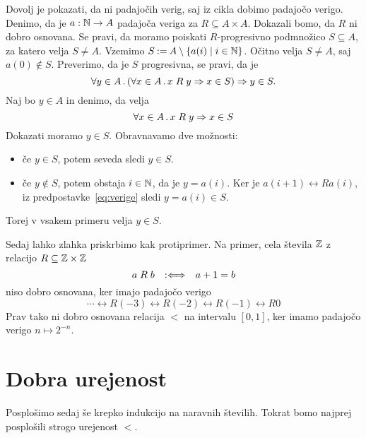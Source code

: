 \begin{dokaz}
  Dovolj je pokazati, da ni padajočih verig, saj iz cikla dobimo padajočo verigo.
  Denimo, da je $a : \mathbb{N} \to A$ padajoča veriga za $R \subseteq A \times A$. Dokazali bomo, da $R$ ni dobro
  osnovana. Se pravi, da moramo poiskati $R$-progresivno podmnožico $S \subseteq A$, za katero velja
  $S \neq A$. Vzemimo $S \mathbin{{:}{=}} A \setminus \left\{ a(i) \mid i \in \mathbb{N}\right\}$. Očitno velja $S \neq A$, saj 
  $a(0) \not\in S$. Preverimo, da je $S$ progresivna, se pravi, da je
  \begin{equation*}
    \forall y \in A \,.\, (\forall x \in A \,.\, x \mathrel{R} y \Rightarrow x \in S) \Rightarrow y \in S.
  \end{equation*}
  Naj bo $y \in A$ in denimo, da velja
  \begin{equation}
    \label{eq:verige}
    \forall x \in A \,.\, x \mathrel{R} y \Rightarrow x \in S
  \end{equation}
  Dokazati moramo $y \in S$. Obravnavamo dve možnosti:
  \begin{itemize}
  \item če $y \in S$, potem seveda sledi $y \in S$.
  \item če $y \not\in S$, potem obstaja $i \in \mathbb{N}$, da je $y = a(i)$. Ker je $a(i+1) \rel{R} a(i)$, iz
    predpostavke~\eqref{eq:verige} sledi $y = a(i) \in S$.
  \end{itemize}
  Torej v vsakem primeru velja $y \in S$.
\end{dokaz}

\begin{primer}
  Sedaj lahko zlahka priskrbimo kak protiprimer. Na primer, cela števila $\mathbb{Z}$ z relacijo $R \subseteq \mathbb{Z} \times \mathbb{Z}$
  \begin{equation*}
    a \mathrel{R} b \quad {{:}{\Longleftrightarrow}}\quad a + 1 = b
  \end{equation*}
  niso dobro osnovana, ker imajo padajočo verigo
  \begin{equation*}
    \cdots \rel{R} (-3) \rel{R} (-2) \rel{R} (-1) \rel{R} 0
  \end{equation*}
  Prav tako ni dobro osnovana relacija $<$ na intervalu $[0,1]$, ker imamo padajočo verigo
  $n \mapsto 2^{-n}$.
\end{primer}

\section{Dobra urejenost}

Posplošimo sedaj še krepko indukcijo na naravnih številih. Tokrat bomo najprej posplošili
strogo urejenost $<$.

